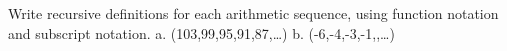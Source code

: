 \documentclass{article}
\newenvironment{tryit}[1]{}{}           %
\newcommand{\answer}[1]{}               %
\begin{document}
\begin{tryit}{2}
Write recursive definitions for each arithmetic sequence, using function notation and subscript notation.
a. (103,99,95,91,87,\ldots)
b. (-6,-4,-3,-1,,\ldots)
\answer{a. (a_n=\begin{cases}103,&n=1\\a_{n-1}-4,&n>1\end{cases}), (f(n)=\begin{cases}103,&n=1\\f(n-1)-4,&n>1\end{cases}). b. (a_n=\begin{cases}-6\frac13,&n=1\\a_{n-1}+1\frac23,&n>1\end{cases}), (g(n)=\begin{cases}-6\frac13,&n=1\\g(n-1)+1\frac23,&n>1\end{cases}).}
\end{tryit}
\end{document}
